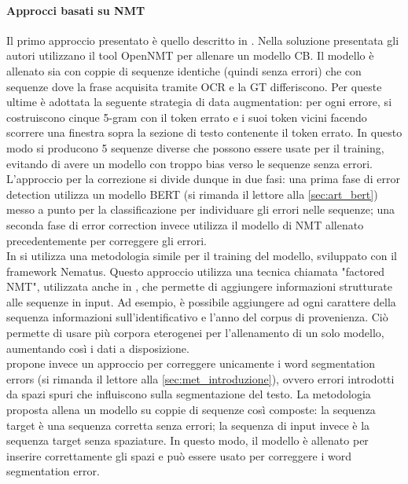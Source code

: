 \paragraph{Approcci basati su NMT}
Il primo approccio presentato è quello descritto in \cite{nguyen2020neural}. Nella soluzione presentata gli autori utilizzano il tool OpenNMT\cite{klein2017opennmt} per allenare un modello CB. Il modello è allenato sia con coppie di sequenze identiche (quindi senza errori) che con sequenze dove la frase acquisita tramite OCR e la GT differiscono. Per queste ultime è adottata la seguente strategia di data augmentation: per ogni errore, si costruiscono cinque 5-gram con il token errato e i suoi token vicini facendo scorrere una finestra sopra la sezione di testo contenente il token errato. In questo modo si producono 5 sequenze diverse che possono essere usate per il training, evitando di avere un modello con troppo bias verso le sequenze senza errori. L'approccio per la correzione si divide dunque in due fasi: una prima fase di error detection utilizza un modello BERT (si rimanda il lettore alla \autoref{sec:art_bert}) messo a punto per la classificazione per individuare gli errori nelle sequenze; una seconda fase di error correction invece utilizza il modello di NMT allenato precedentemente per correggere gli errori.\\
In \cite{amrhein2018supervised} si utilizza una metodologia simile per il training del modello, sviluppato con il framework Nematus\cite{sennrich2017nematus}. Questo approccio utilizza una tecnica chiamata "factored NMT", utilizzata anche in \cite{nguyen2020neural}, che permette di aggiungere informazioni strutturate alle sequenze in input. Ad esempio, è possibile aggiungere ad ogni carattere della sequenza informazioni sull'identificativo e l'anno del corpus di provenienza. Ciò permette di usare più corpora eterogenei per l'allenamento di un solo modello, aumentando così i dati a disposizione.\\
\cite{nastase2018correction} propone invece un approccio per correggere unicamente i word segmentation errors (si rimanda il lettore alla \autoref{sec:met_introduzione}), ovvero errori introdotti da spazi spuri che influiscono sulla segmentazione del testo. La metodologia proposta allena un modello su coppie di sequenze così composte: la sequenza target è una sequenza corretta senza errori; la sequenza di input invece è la sequenza target senza spaziature. In questo modo, il modello è allenato per inserire correttamente gli spazi e può essere usato per correggere i word segmentation error.\\
